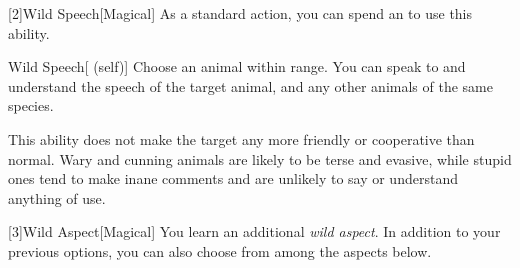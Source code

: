         [2]{Wild Speech}[Magical] As a standard action, you can spend an  to use this ability.
        \begin{ability}{Wild Speech}[ (self)]
            Choose an animal within \rnglong range.
            You can speak to and understand the speech of the target animal, and any other animals of the same species.

            This ability does not make the target any more friendly or cooperative than normal.
            Wary and cunning animals are likely to be terse and evasive, while stupid ones tend to make inane comments and are unlikely to say or understand anything of use.
        \end{ability}

        [3]{Wild Aspect}[Magical]
        You learn an additional \textit{wild aspect}.
        In addition to your previous options, you can also choose from among the aspects below.
